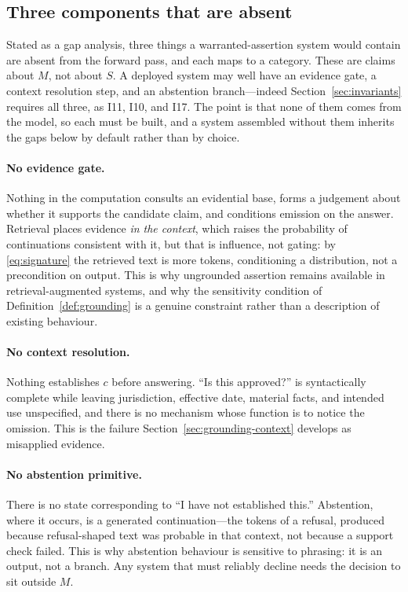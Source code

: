 \subsection{Three components that are absent}
\label{sec:missing}

Stated as a gap analysis, three things a warranted-assertion system would contain
are absent from the forward pass, and each maps to a category. These are claims about
$M$, not about $S$. A deployed system may well have an evidence gate, a context
resolution step, and an abstention branch---indeed Section~\ref{sec:invariants}
requires all three, as I11, I10, and I17. The point is that none of them comes from the
model, so each must be built, and a system assembled without them inherits the gaps
below by default rather than by choice.

\paragraph{No evidence gate.} Nothing in the computation consults an evidential
base, forms a judgement about whether it supports the candidate claim, and
conditions emission on the answer. Retrieval places evidence \emph{in the
context}, which raises the probability of continuations consistent with it, but
that is influence, not gating: by \eqref{eq:signature} the retrieved text is more
tokens, conditioning a distribution, not a precondition on output. This is why ungrounded
assertion remains available in retrieval-augmented systems, and why the
sensitivity condition of Definition~\ref{def:grounding} is a genuine constraint
rather than a description of existing behaviour.

\paragraph{No context resolution.} Nothing establishes $c$ before answering.
``Is this approved?'' is syntactically complete while leaving jurisdiction,
effective date, material facts, and intended use unspecified, and there is no
mechanism whose function is to notice the omission. This is the failure
Section~\ref{sec:grounding-context} develops as misapplied evidence.

\paragraph{No abstention primitive.} There is no state corresponding to ``I have
not established this.'' Abstention, where it occurs, is a generated
continuation---the tokens of a refusal, produced because refusal-shaped text was
probable in that context, not because a support check failed. This is why
abstention behaviour is sensitive to phrasing: it is an output, not a branch. Any
system that must reliably decline needs the decision to sit outside $M$.


